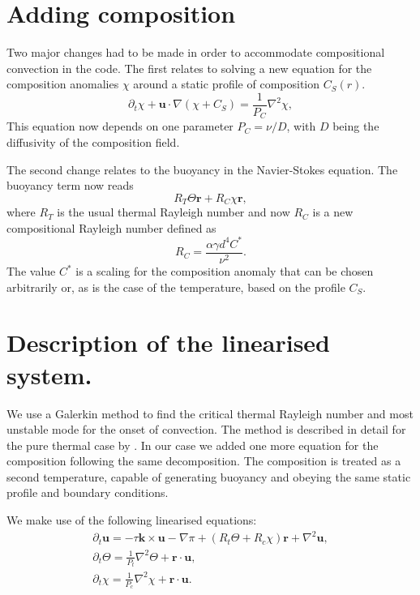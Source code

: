 \documentclass[a4paper,10pt]{book}
\renewcommand{\vec}[1]{\mathbf{#1}}
\begin{document}
\section{Adding composition}
Two major changes had to be made in order to accommodate compositional
convection in the code. The first relates to solving a new equation for the
composition anomalies $\chi$ around a static profile of composition $C_S(r)$.
\begin{equation}
\partial_t \chi  + \vec u \cdot \nabla (\chi+C_S) = \frac{1}{P_C} \nabla^2 \chi,
\label{e:composition}
\end{equation}
This equation now depends on one parameter $P_C=\nu/D$, with $D$
being the diffusivity of the composition field.

The second change relates to the buoyancy in the Navier-Stokes equation. The
buoyancy term now reads
\begin{equation}
  R_T \Theta \vec r + R_C \chi \vec r,
\end{equation}
where $R_T$ is the usual thermal Rayleigh number and now $R_C$ is a new
compositional Rayleigh number defined as
\begin{equation}
 R_C = \frac{\alpha \gamma d^4 C^*}{\nu^2}.
\end{equation}
The value $C^*$ is a scaling for the composition anomaly that can be
chosen arbitrarily or, as is the case of the temperature, based on the profile
$C_S$.



\section{Description of the linearised system.}
\label{s:problemSetup}
We use a Galerkin method to find the critical thermal Rayleigh number and most
unstable mode for the onset of convection. The method is described in detail for
the pure thermal case by \citep{ZhangBusse87}. In our case we added one more
equation for the composition following the same decomposition. The composition
is treated as a second temperature, capable of generating buoyancy and obeying
the same static profile and boundary conditions.

We make use of the following linearised equations:
\begin{subequations}
\label{eqs:linearizedConvection}
\begin{gather}
\label{eq:NavierStokes}
\partial_t \vec u = - \tau \vec k \times \vec u - \nabla \pi + (R_t \Theta +R_c \chi )\vec r + \nabla^2 \vec u, \\
\label{eq:temperature}
\partial_t \Theta = \frac{1}{P_t}\nabla^2 \Theta + \vec r \cdot \vec u , \\
\label{eq:composition}
\partial_t \chi = \frac{1}{P_c}\nabla^2 \chi  + \vec r \cdot \vec u .
\end{gather}
\end{subequations}
\end{document}
